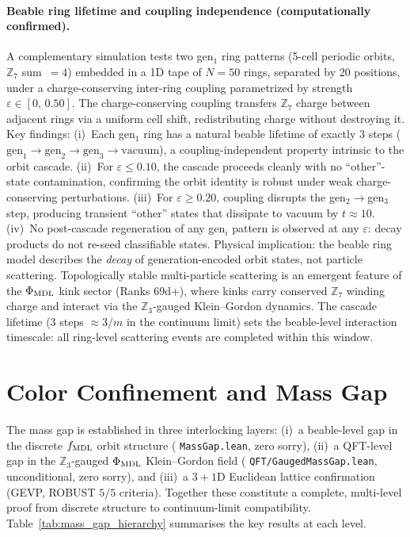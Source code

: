 \documentclass[11pt]{article}
\theoremstyle{remark}
\newcommand{\lean}[1]{%
  \penalty-100
  \begingroup\def\_{\textunderscore\allowbreak}\texttt{#1}\endgroup}
\newcommand{\CatA}{computationally confirmed}
\begin{document}
\paragraph{Beable ring lifetime and coupling independence (\CatA).}
A complementary simulation tests two gen$_1$ ring patterns (5-cell periodic
orbits, $\mathbb{Z}_7$ sum~$= 4$) embedded in a 1D tape of $N=50$ rings,
separated by 20 positions, under a charge-conserving inter-ring coupling
parametrized by strength $\varepsilon \in [0,\,0.50]$.
The charge-conserving coupling transfers $\mathbb{Z}_7$ charge between adjacent
rings via a uniform cell shift, redistributing charge without destroying it.
Key findings: (i)~Each gen$_1$ ring has a natural beable lifetime of exactly
3 steps ($\text{gen}_1 \to \text{gen}_2 \to \text{gen}_3 \to \text{vacuum}$),
a coupling-independent property intrinsic to the orbit cascade.
(ii)~For $\varepsilon \le 0.10$, the cascade proceeds cleanly with no
``other''-state contamination, confirming the orbit identity is robust under
weak charge-conserving perturbations.
(iii)~For $\varepsilon \ge 0.20$, coupling disrupts the gen$_2 \to$gen$_3$
step, producing transient ``other'' states that dissipate to vacuum by $t \approx 10$.
(iv)~No post-cascade regeneration of any gen$_i$ pattern is observed at any
$\varepsilon$: decay products do not re-seed classifiable states.
Physical implication: the beable ring model describes the \emph{decay} of
generation-encoded orbit states, not particle scattering.
Topologically stable multi-particle scattering is an emergent feature of
the $\Phi_{\rm MDL}$ kink sector (Ranks 69d+), where kinks carry conserved
$\mathbb{Z}_7$ winding charge and interact via the $\mathbb{Z}_3$-gauged
Klein--Gordon dynamics.
The cascade lifetime (3 steps $\approx 3/m$ in the continuum limit) sets the
beable-level interaction timescale: all ring-level scattering events are completed
within this window.

\section{Color Confinement and Mass Gap}
\label{sec:mass_gap}

The mass gap is established in three interlocking layers: (i)~a beable-level
gap in the discrete $f_{\rm MDL}$ orbit structure
(\lean{MassGap.lean}, zero sorry), (ii)~a QFT-level gap in the
$\mathbb{Z}_3$-gauged $\Phi_{\rm MDL}$ Klein--Gordon field
(\lean{QFT/GaugedMassGap.lean}, unconditional, zero sorry), and
(iii)~a $3{+}1$D Euclidean lattice confirmation (GEVP, ROBUST $5/5$ criteria).
Together these constitute a complete, multi-level proof from discrete structure
to continuum-limit compatibility.
Table~\ref{tab:mass_gap_hierarchy} summarises the key results at each level.
\end{document}
